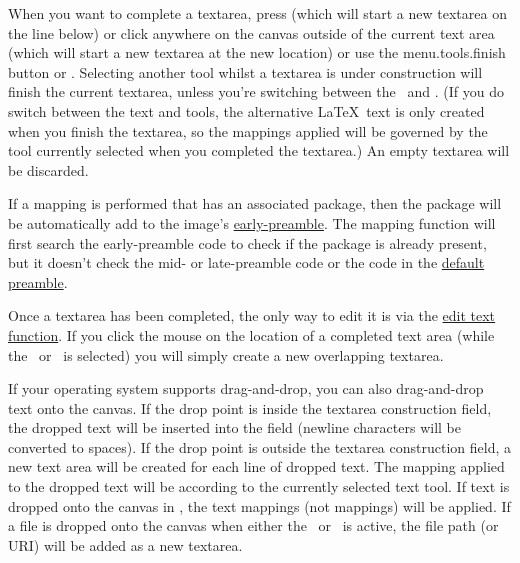 When you want to complete a \gls{textarea}, press
 (which will start a new
\gls{textarea} on the line below) or click anywhere on the canvas
outside of the current text area (which will start a new
\gls{textarea} at the new location) or use the
\gls{menu.tools.finish} button or .  Selecting
another tool whilst a \gls{textarea} is under construction will
finish the current \gls{textarea}, unless you're switching between
the \texttool\ and \mathstool.  (If you do switch between the
text and  tools, the alternative \LaTeX\ text is only
created when you finish the \gls*{textarea}, so the mappings applied
will be governed by the tool currently selected when you completed
the \gls*{textarea}.) An empty \gls{textarea} will be discarded.

If a mapping is performed that has an associated package, then the
package will be automatically add to the image's
\hyperref[sec:preamble]{early-preamble}. The mapping function will
first search the early-preamble code to check if the package is
already present, but it doesn't check the mid- or late-preamble code
or the code in the \hyperref[sec:texconfigpreamble]{default
preamble}.

Once a \gls{textarea} has been completed, the only way to edit it is via the
\hyperref[sec:edittext]{edit text function}. If you click the
mouse on the location of a completed text area (while the
\texttool\ or \mathstool\ is selected) you will simply create a new
overlapping \gls*{textarea}.

If your operating system supports \gls{drag-and-drop}, you can also
\gls{drag-and-drop} text onto the \gls{canvas}. If the drop point is
inside the \gls{textarea} construction field, the dropped text will
be inserted into the field (newline characters will be converted to
spaces). If the drop point is outside the \gls{textarea}
construction field, a new text area will be created for each line of
dropped text. The mapping applied to the dropped text will be
according to the currently selected text tool.  If text is dropped
onto the \gls{canvas} in \selectmode, the text mappings (not
 mappings) will be applied. If a file is dropped onto
the \gls{canvas} when either the \texttool\ or \mathstool\ is
active, the file path (or URI) will be added as a new
\gls{textarea}.

